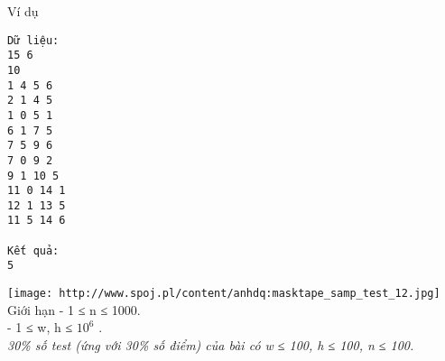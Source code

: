 Ví dụ  
\begin{verbatim}
Dữ liệu:
15 6
10
1 4 5 6
2 1 4 5
1 0 5 1
6 1 7 5
7 5 9 6
7 0 9 2
9 1 10 5
11 0 14 1
12 1 13 5
11 5 14 6

Kết quả:
5
\end{verbatim}
\texttt{[image: http://www.spoj.pl/content/anhdq:masktape\_samp\_test\_12.jpg]}
   Giới hạn  
- 1 ≤ n ≤ 1000.   
\\   - 1 ≤ w, h ≤ $10^{6}$   .   
\\\textit{     30\% số test (ứng với 30\% số điểm) của bài có  w ≤ 100, h ≤ 100, n ≤ 100.    }